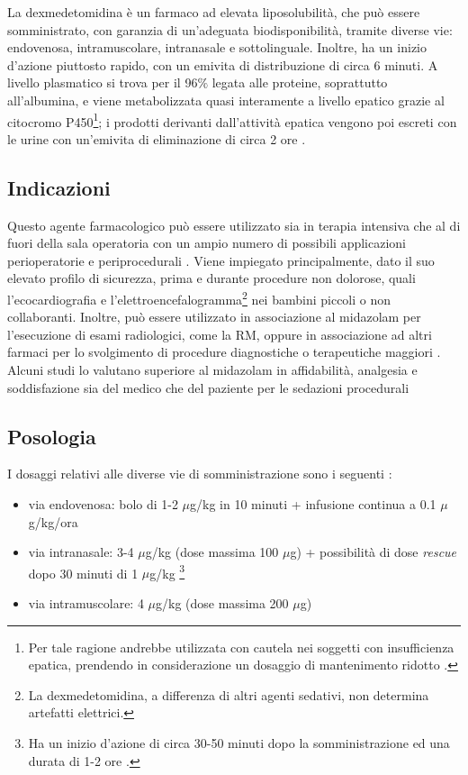 La dexmedetomidina è un farmaco ad elevata liposolubilità, che può essere somministrato, con garanzia di un'adeguata biodisponibilità, tramite diverse vie: endovenosa, intramuscolare, intranasale e sottolinguale. Inoltre, ha un inizio d'azione piuttosto rapido, con un emivita di distribuzione di circa 6 minuti. A livello plasmatico si trova per il 96$\%$ legata alle proteine, soprattutto all'albumina, e viene metabolizzata quasi interamente a livello epatico grazie al citocromo P450\footnote{Per tale ragione andrebbe utilizzata con cautela nei soggetti con insufficienza epatica, prendendo in considerazione un dosaggio di mantenimento ridotto \cite{Keating2015}.}; i prodotti derivanti dall'attività epatica vengono poi escreti con le urine con un'emivita di eliminazione di circa 2 ore \cite{Gertler2001, Keating2015, Weerink2017}. 

\subsection*{Indicazioni}

Questo agente farmacologico può essere utilizzato sia in terapia intensiva che al di fuori della sala operatoria con un ampio numero di possibili applicazioni perioperatorie e periprocedurali \cite{Mahmoud2015}. Viene impiegato principalmente, dato il suo elevato profilo di sicurezza, prima e durante procedure non dolorose, quali l'ecocardiografia e l'elettroencefalogramma\footnote{La dexmedetomidina, a differenza di altri agenti sedativi, non determina artefatti elettrici.} nei bambini piccoli o non collaboranti. Inoltre, può essere utilizzato in associazione al midazolam per l'esecuzione di esami radiologici, come la RM, oppure in associazione ad altri farmaci per lo svolgimento di procedure diagnostiche o terapeutiche maggiori \cite{Simeupsedazione}. Alcuni studi lo valutano superiore al midazolam in affidabilità, analgesia e soddisfazione sia del medico che del paziente per le sedazioni procedurali \cite{Barends2017, Lin}

\subsection*{Posologia}

I dosaggi relativi alle diverse vie di somministrazione sono i seguenti \cite{Simeupsedazione}: 

\begin{itemize}
    \item via endovenosa: bolo di 1-2 $\mu$g/kg in 10 minuti + infusione continua a 0.1 $\mu$g/kg/ora
    \item via intranasale: 3-4 $\mu$g/kg (dose massima 100 $\mu$g) + possibilità di dose \emph{rescue} dopo 30 minuti di 1 $\mu$g/kg \footnote{Ha un inizio d'azione di circa 30-50 minuti dopo la somministrazione ed una durata di 1-2 ore \cite{Simeupsedazione}.}
    \item via intramuscolare: 4 $\mu$g/kg (dose massima 200 $\mu$g)
\end{itemize}